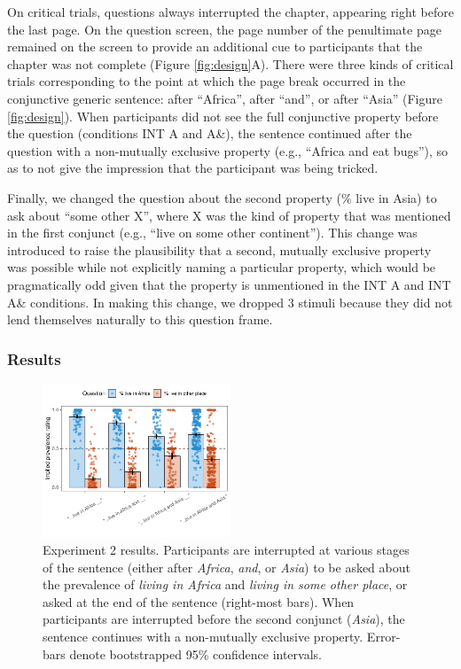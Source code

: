 \documentclass[10pt,letterpaper]{article}
\begin{document}
On critical trials, questions always interrupted the chapter, appearing right before the last page.
On the question screen, the page number of the penultimate page remained on the screen to provide an additional cue to participants that the chapter was not complete (Figure \ref{fig:design}A).
There were three kinds of critical trials corresponding to the point at which the page break occurred in the conjunctive generic sentence: after ``Africa'', after ``and'', or after ``Asia'' (Figure \ref{fig:design}). 
When participants did not see the full conjunctive property before the question (conditions INT A and A\&), the sentence continued after the question with a non-mutually exclusive property (e.g., ``Africa and eat bugs''), so as to not give the impression that the participant was being tricked. 

Finally, we changed the question about the second property (\% live in Asia) to ask about ``some other X'', where X was the kind of property that was mentioned in the first conjunct (e.g., ``live on some other continent'').
This change was introduced to raise the plausibility that a second, mutually exclusive property was possible while not explicitly naming a particular property, which would be pragmatically odd given that the property is unmentioned in the INT A and INT A\& conditions. 
In making this change, we dropped 3 stimuli because they did not lend themselves naturally to this question frame.
 \subsubsection{Results}
 
\begin{figure}[h]
  \centering
    \includegraphics[width=0.5\textwidth]{expt3_summary}
  \caption{Experiment 2 results. Participants are interrupted at various stages of the sentence (either after \emph{Africa}, \emph{and}, or \emph{Asia}) to be asked about the prevalence of \emph{living in Africa} and \emph{living in some other place}, or asked at the end of the sentence (right-most bars). When participants are interrupted before the second conjunct (\emph{Asia}), the sentence continues with a non-mutually exclusive property. Error-bars denote bootstrapped 95\% confidence intervals.}
    \label{fig:expt3}
  \end{figure}
  
\end{document}

